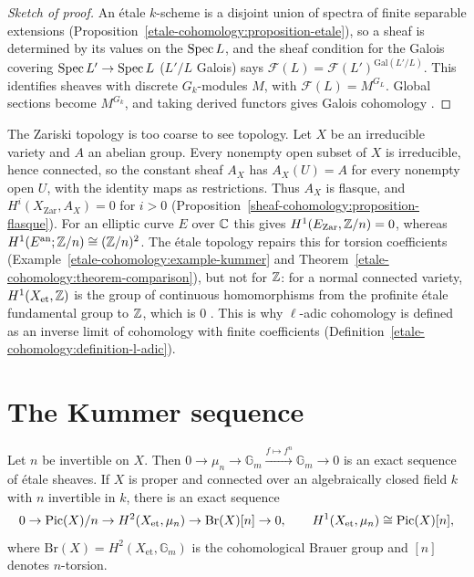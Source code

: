 \begin{proof}[Sketch of proof]
An \'etale $k$-scheme is a disjoint union of spectra of finite separable extensions (Proposition~\ref{etale-cohomology:proposition-etale}), so a sheaf is determined by its values on the
$\operatorname{Spec} L$, and the sheaf condition for the Galois covering $\operatorname{Spec} L' \to \operatorname{Spec} L$ ($L'/L$ Galois) says $\mathcal{F}(L) = \mathcal{F}(L')^{\mathrm{Gal}(L'/L)}$. This identifies sheaves with discrete
$G_k$-modules $M$, with $\mathcal{F}(L) = M^{G_L}$. Global sections become $M^{G_k}$, and taking derived functors gives Galois cohomology \cite[Chapters II and III]{milne-etale}.
\end{proof}

\begin{counterexample}\label{etale-cohomology:counterexample-zariski}
The Zariski topology is too coarse to see topology. Let $X$ be an irreducible variety and $A$ an abelian group. Every nonempty open subset of $X$ is irreducible, hence connected, so the constant sheaf $A_X$
has $A_X(U) = A$ for every nonempty open $U$, with the identity maps as restrictions. Thus $A_X$ is flasque, and $H^i(X_{\mathrm{Zar}}, A_X) = 0$ for $i > 0$
(Proposition~\ref{sheaf-cohomology:proposition-flasque}). For an elliptic curve $E$ over $\mathbb{C}$ this gives $H^1(E_{\mathrm{Zar}}, \mathbb{Z}/n) = 0$, whereas $H^1(E^{\mathrm{an}}; \mathbb{Z}/n) \cong (\mathbb{Z}/n)^2$. The \'etale topology
repairs this for torsion coefficients (Example~\ref{etale-cohomology:example-kummer} and Theorem~\ref{etale-cohomology:theorem-comparison}), but not for $\mathbb{Z}$: for a normal connected variety,
$H^1(X_{\mathrm{et}}, \mathbb{Z})$ is the group of continuous homomorphisms from the profinite \'etale fundamental group to $\mathbb{Z}$, which is $0$ \cite[Chapter III]{milne-etale}. This is why $\ell$-adic cohomology is defined as
an inverse limit of cohomology with finite coefficients (Definition~\ref{etale-cohomology:definition-l-adic}).
\end{counterexample}

\section{The Kummer sequence}\label{etale-cohomology:section-kummer}

\begin{proposition}\label{etale-cohomology:proposition-kummer}
Let $n$ be invertible on $X$. Then $0 \to \mu_n \to \mathbb{G}_m \xrightarrow{f \mapsto f^n} \mathbb{G}_m \to 0$ is an exact sequence of \'etale sheaves. If $X$ is proper and connected over an
algebraically closed field $k$ with $n$ invertible in $k$, there is an exact sequence
\[
0 \to \operatorname{Pic}(X)/n \to H^2(X_{\mathrm{et}}, \mu_n) \to \mathrm{Br}(X)[n] \to 0, \qquad H^1(X_{\mathrm{et}}, \mu_n) \cong \operatorname{Pic}(X)[n],
\]
where $\mathrm{Br}(X) = H^2(X_{\mathrm{et}}, \mathbb{G}_m)$ is the cohomological Brauer group and $[n]$ denotes $n$-torsion.
\end{proposition}

